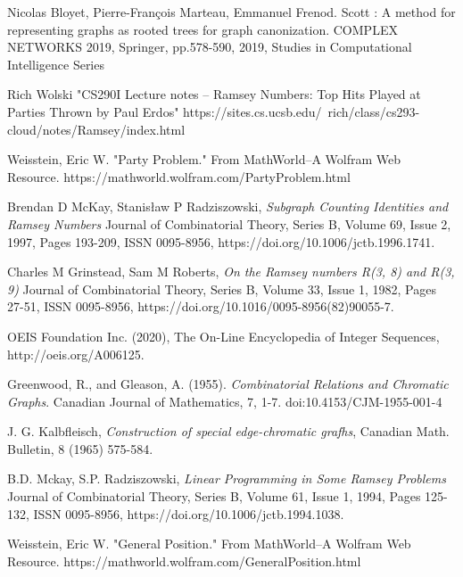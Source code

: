 \begin{thebibliography}{9}
       Nicolas Bloyet, Pierre-François Marteau, Emmanuel Frenod. Scott : A method for representing graphs
      as rooted trees for graph canonization. COMPLEX NETWORKS 2019, Springer, pp.578-590, 2019,
      Studies in Computational Intelligence Series
      
       Rich Wolski "CS290I Lecture notes -- Ramsey Numbers: Top Hits Played at Parties Thrown by Paul Erdos" https://sites.cs.ucsb.edu/~rich/class/cs293-cloud/notes/Ramsey/index.html

 Weisstein, Eric W. "Party Problem." From MathWorld--A Wolfram Web Resource. https://mathworld.wolfram.com/PartyProblem.html 
 
 Brendan D McKay, Stanisław P Radziszowski,
\textit{Subgraph Counting Identities and Ramsey Numbers}
Journal of Combinatorial Theory, Series B,
Volume 69, Issue 2,
1997,
Pages 193-209,
ISSN 0095-8956,
https://doi.org/10.1006/jctb.1996.1741.

Charles M Grinstead, Sam M Roberts,
\textit{On the Ramsey numbers R(3, 8) and R(3, 9)}
Journal of Combinatorial Theory, Series B,
Volume 33, Issue 1,
1982,
Pages 27-51,
ISSN 0095-8956,
https://doi.org/10.1016/0095-8956(82)90055-7.

       OEIS Foundation Inc. (2020), The On-Line Encyclopedia of Integer Sequences, http://oeis.org/A006125.
	   
Greenwood, R., and Gleason, A. (1955). \textit{Combinatorial Relations and Chromatic Graphs}. Canadian Journal of Mathematics, 7, 1-7. doi:10.4153/CJM-1955-001-4

J. G. Kalbfleisch, \textit{Construction of special edge-chromatic grafhs}, Canadian Math. Bulletin, 8 (1965) 575-584.

B.D. Mckay, S.P. Radziszowski,
\textit{Linear Programming in Some Ramsey Problems}
Journal of Combinatorial Theory, Series B,
Volume 61, Issue 1,
1994,
Pages 125-132,
ISSN 0095-8956,
https://doi.org/10.1006/jctb.1994.1038.

 Weisstein, Eric W. "General Position." From MathWorld--A Wolfram Web Resource. https://mathworld.wolfram.com/GeneralPosition.html 






  \end{thebibliography}